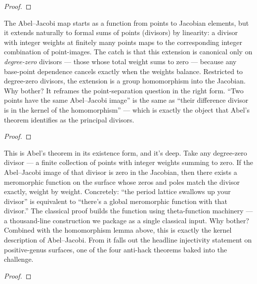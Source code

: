 \begin{proof}\leanok\end{proof}

\begin{layman}
The Abel--Jacobi map starts as a function from points to Jacobian
elements, but it extends naturally to formal sums of points (divisors)
by linearity: a divisor with integer weights at finitely many points
maps to the corresponding integer combination of point-images. The
catch is that this extension is canonical only on \emph{degree-zero}
divisors --- those whose total weight sums to zero --- because any
base-point dependence cancels exactly when the weights balance.
Restricted to degree-zero divisors, the extension is a group
homomorphism into the Jacobian. Why bother? It reframes the
point-separation question in the right form. ``Two points have the
same Abel--Jacobi image'' is the same as ``their difference divisor
is in the kernel of the homomorphism'' --- which is exactly the object
that Abel's theorem identifies as the principal divisors.
\end{layman}


\begin{proof}\leanok\end{proof}

\begin{layman}
This is Abel's theorem in its existence form, and it's deep. Take any
degree-zero divisor --- a finite collection of points with integer weights
summing to zero. If the Abel--Jacobi image of that divisor is zero in
the Jacobian, then there exists a meromorphic function on the surface
whose zeros and poles match the divisor exactly, weight by weight.
Concretely: ``the period lattice swallows up your divisor'' is
equivalent to ``there's a global meromorphic function with that
divisor.'' The classical proof builds the function using
theta-function machinery --- a thousand-line construction we package as a
single classical input. Why bother? Combined with the homomorphism
lemma above, this is exactly the kernel description of Abel--Jacobi.
From it falls out the headline injectivity statement on positive-genus
surfaces, one of the four anti-hack theorems baked into the challenge.
\end{layman}


\begin{proof}\leanok\end{proof}

